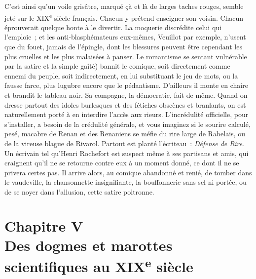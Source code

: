 \documentclass[french,twoside]{book} %
\newcommand\chapteropen{} %
\newcommand\chapterclose{} %
\begin{document}
C’est ainsi qu’un voile grisâtre, marqué çà et là de larges taches rouges, semble jeté sur le XIX\textsuperscript{e} siècle français. Chacun y prétend enseigner son voisin. Chacun éprouverait quelque honte à le divertir. La moquerie discrédite celui qui l’emploie ; et les anti-blasphémateurs eux-mêmes, Veuillot par exemple, n’usent que du fouet, jamais de l’épingle, dont les blessures peuvent être cependant les plus cruelles et les plus malaisées à panser. Le romantisme se sentant vulnérable par la satire et la simple gaîté) bannit le comique, soit directement comme ennemi du peuple, soit indirectement, en lui substituant le jeu de mots, ou la fausse farce, plus lugubre encore que le pédantisme. D’ailleurs il monte en chaire et brandit le tableau noir. Sa compagne, la démocratie, fait de même. Quand on dresse partout des idoles burlesques et des fétiches obscènes et branlants, on est naturellement porté à en interdire l’accès aux rieurs. L’incrédulité officielle, pour s’installer, a besoin de la crédulité générale, et vous imaginez si le sourire calculé, pesé, macabre de Renan et des Renaniens se méfie du rire large de Rabelais, ou de la vireuse blague de Rivarol. Partout est planté l’écriteau : {\itshape Défense de Rire}. Un écrivain tel qu’Henri Rochefort est suspect même à ses partisans et amis, qui craignent qu’il ne se retourne contre eux à un moment donné, ce dont il ne se privera certes pas. Il arrive alors, au comique abandonné et renié, de tomber dans le vaudeville, la chansonnette insignifiante, la bouffonnerie sans sel ni portée, ou de se noyer dans l’allusion, cette satire poltronne.
\chapterclose


\chapteropen
\chapter[{Chapitre V. Des dogmes et marottes scientifiques au XIXe siècle}]{Chapitre V\\
Des dogmes et marottes scientifiques au XIX\textsuperscript{e} siècle}\renewcommand{\leftmark}{Chapitre V\\
Des dogmes et marottes scientifiques au XIX\textsuperscript{e} siècle}
\end{document}
